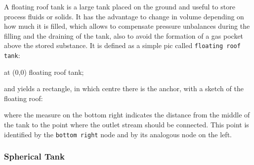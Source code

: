 \documentclass[12pt]{article}						%
\newcommand*{\chpn}[1]{\texttt{#1}}				%
\newcommand*{\chpp}[1]{\texttt{#1}}				%
\begin{document}
A floating roof tank is a large tank placed on the ground and useful to store
process fluids or solids. It has the advantage to change in volume depending on
how much it is filled, which allows to compensate pressure unbalances during
the filling and the draining of the tank, also to avoid the formation of a gas
pocket above the stored substance. It is defined as a simple pic called
\chpp{floating roof tank}:
\begin{chpcode}
	\pic at (0,0) {floating roof tank};
\end{chpcode}
and yields a rectangle, in which centre there is the anchor, with a sketch of the
floating roof:
\begin{center}
\end{center}
where the measure on the bottom right indicates the distance from the middle of
the tank to the point where the outlet stream should be connected. This point is
identified by the \chpn{bottom right} node and by its analogous node on the left.

\subsubsection{Spherical Tank}
\end{document}
